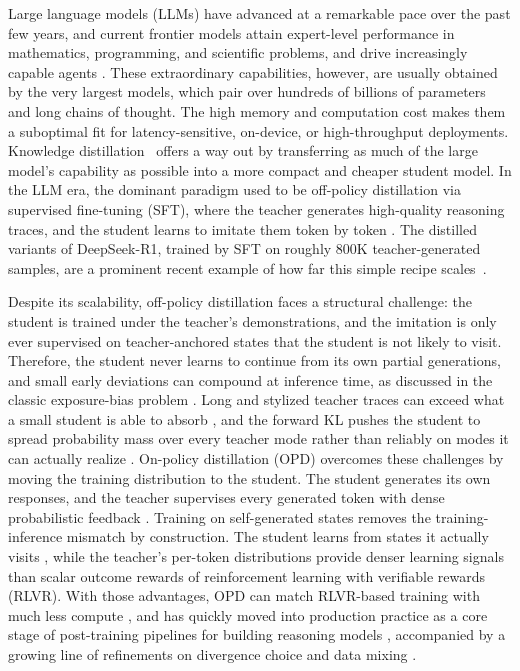 \documentclass{article} %
\begin{document}
Large language models (LLMs) have advanced at a remarkable pace over the past few years, and current frontier models attain expert-level performance in mathematics, programming, and scientific problems, and drive increasingly capable agents \citep{openai2026astra, anthropic2026fable, zai2026glm53, xu2026deepseek}. These extraordinary capabilities, however, are usually obtained by the very largest models, which pair over hundreds of billions of parameters and long chains of thought. The high memory and computation cost makes them a suboptimal fit for latency-sensitive, on-device, or high-throughput deployments.
Knowledge distillation~\citep{hinton2015distilling} offers a way out by transferring as much of the large model's capability as possible into a more compact and cheaper student model. In the LLM era, the dominant paradigm used to be off-policy distillation via supervised fine-tuning (SFT), where the teacher generates high-quality reasoning traces, and the student learns to imitate them token by token \citep{kim2016sequence, ho2023large, magister2023teaching, hsieh2023distilling}. The distilled variants of DeepSeek-R1, trained by SFT on roughly 800K teacher-generated samples, are a prominent recent example of how far this simple recipe scales~\citep{guo2025deepseek}.

Despite its scalability, off-policy distillation faces a structural challenge: the student is trained under the teacher's demonstrations, and the imitation is only ever supervised on teacher-anchored states that the student is not likely to visit. Therefore, the student never learns to continue from its own partial generations, and small early deviations can compound at inference time, as discussed in the classic exposure-bias problem \citep{bengio2015scheduled, ranzato2015sequence, arora2022exposure}. 
Long and stylized teacher traces can exceed what a small student is able to absorb \citep{mirzadeh2020improved, shing2025taid, li2025small}, and the forward KL pushes the student to spread probability mass over every teacher mode rather than reliably on modes it can actually realize \citep{gu2024minillm}. 
On-policy distillation (OPD) overcomes these challenges by moving the training distribution to the student. The student generates its own responses, and the teacher supervises every generated token with dense probabilistic feedback \citep{gkd, gu2024minillm, lu2025onpolicydistillation}. Training on self-generated states removes the training-inference mismatch by construction. The student learns from states it actually visits \citep{ross2011reduction}, while the teacher's per-token distributions provide denser learning signals than scalar outcome rewards of reinforcement learning with verifiable rewards (RLVR). With those advantages, OPD can match RLVR-based training with much less compute \citep{lu2025onpolicydistillation}, and has quickly moved into production practice as a core stage of post-training pipelines for building reasoning models \citep{yang2025qwen3, ma2026mopd}, accompanied by a growing line of refinements on divergence choice and data mixing \citep{ko2024distillm}.
\end{document}

